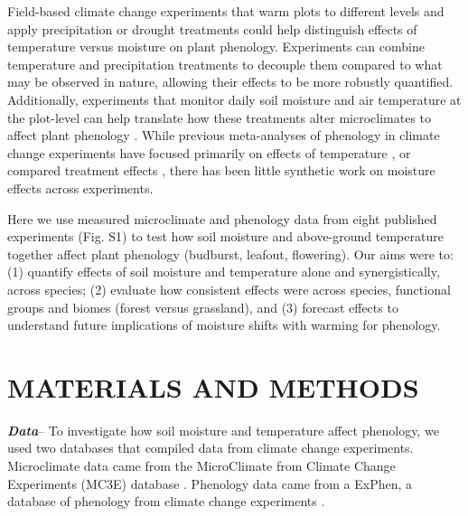 \documentclass{article}
\begin{document}
\par Field-based climate change experiments that warm plots to different levels and apply precipitation or drought treatments could help distinguish effects of temperature versus moisture on plant phenology. Experiments can combine temperature and precipitation treatments to decouple them compared to what may be observed in nature, allowing their effects to be more robustly quantified. Additionally, experiments that monitor daily soil moisture and air temperature at the plot-level can help translate how these treatments alter microclimates to affect plant phenology \citep{ettinger2019}. While previous meta-analyses of phenology in climate change experiments have focused primarily on effects of temperature \citep[e.g.,][]{wolkovich2012a}, or compared treatment effects \citep{zhou2023climate}, there has been little synthetic work on moisture effects across experiments. 

\par Here we use measured microclimate and phenology data from eight published experiments (Fig. S1) to test how soil moisture and above-ground temperature together affect plant phenology (budburst, leafout, flowering). Our aims were to: (1) quantify effects of soil moisture and temperature alone and synergistically, across species; (2) evaluate how consistent effects were across species, functional groups and biomes (forest versus grassland), and (3) forecast effects to understand future implications of moisture shifts with warming for phenology. 

\section* {MATERIALS AND METHODS}
\textbf {\emph{Data}}-- To investigate how soil moisture and temperature affect phenology, we used two databases that compiled data from climate change experiments. Microclimate data came from the MicroClimate from Climate Change Experiments (MC3E) database \citep{ettinger2018, ettinger2019}. Phenology data came from a ExPhen, a database of phenology from climate change experiments \citep[which has not been previously analyzed][]{ettinger2022}.
\end{document}
